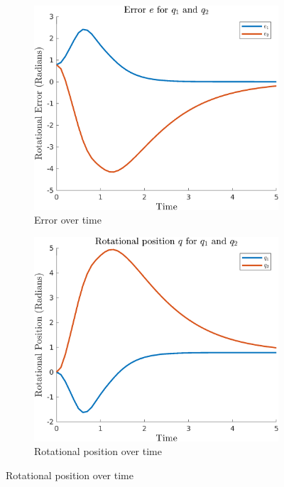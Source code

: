 \documentclass{article}
\begin{document}
\begin{figure}[H]
    \centering
    \begin{subfigure}{0.325\textwidth}
        \centering
        \includegraphics[width = \textwidth]{figures/error-d2.png}
        \caption{Error over time}
    \end{subfigure}
    \begin{subfigure}{0.325\textwidth}
        \centering
        \includegraphics[width = \textwidth]{figures/rotational-position-d2.png}
        \caption{Rotational position over time}

\end{subfigure}
\end{figure}
\end{document}
